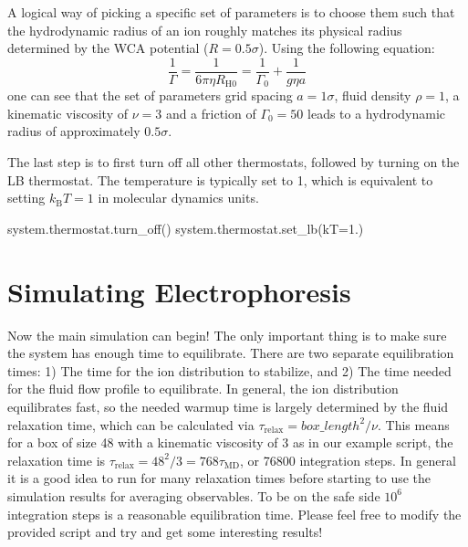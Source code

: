 \documentclass[
paper=a4,                       %
fontsize=11pt,                  %
twoside,                        %
footsepline,                    %
headsepline,                    %
headinclude=false,              %
footinclude=false,              %
pagesize,                       %
]{scrartcl}
\begin{document}
A logical way of picking a specific set of parameters is to choose them such that the hydrodynamic radius of an ion roughly matches its physical radius determined by the
WCA potential ($R=0.5\sigma$). Using the following equation:
\begin{equation}
\frac{1}{\Gamma}=\frac{1}{6\pi \eta R_{\mathrm{H0}}}=\frac{1}{\Gamma_0} 
+\frac{1}{g\eta a} 
 \label{effectiveGammaEq}
\end{equation}
one can see that the set of parameters grid spacing $a=1\sigma$, fluid density $\rho=1$, a 
kinematic viscosity of $\nu=3 $ and a friction of $\Gamma_0=50$ leads to a hydrodynamic radius
of approximately $0.5\sigma$.

The last step is to first turn off all other thermostats, followed by turning on the LB thermostat. The temperature is typically set to 1, which is equivalent to setting
$k_\mathrm{B}T=1$ in molecular dynamics units.

{\small\vspace{0,2cm}
\begin{pypresso}[numbers=none]
system.thermostat.turn_off()
system.thermostat.set_lb(kT=1.)
\end{pypresso}
}

\section{Simulating Electrophoresis}
Now the main simulation can begin! The only important thing is to make sure the system has enough time to equilibrate. There are two separate equilibration times: 1) The time for the ion distribution to stabilize, and 2) The time
needed for the fluid flow profile to equilibrate. In general, the ion distribution equilibrates fast, so the needed warmup time is largely determined by the fluid relaxation time, which can be calculated via $\tau_\mathrm{relax} = box\_length^2/\nu$. This means for a box of size 48 with a kinematic viscosity of 3 as in our example script, the relaxation time is $\tau_\mathrm{relax} = 48^2/3 = 768 \tau_\mathrm{MD}$, or 76800 integration steps. In general it is a good idea to run for many relaxation times before starting to use the simulation results for averaging observables. To be on the safe side $10^6$ integration steps is a reasonable equilibration time. Please feel free to modify the provided script and try and get some interesting results!
\end{document}
